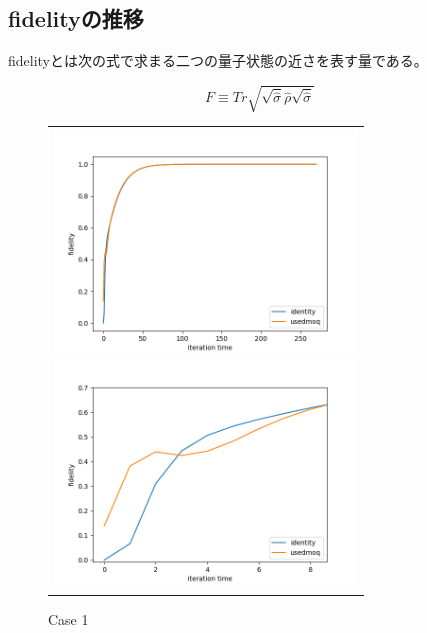 \documentclass[11pt,a4j,notitlepage]{jreport}
\begin{document}
	\newpage

	\subsection*{fidelityの推移}

	fidelityとは次の式で求まる二つの量子状態の近さを表す量である。

	\begin{equation}
		F \equiv Tr \sqrt{\sqrt{\hat{\sigma}} \hat{\rho} \sqrt{\hat{\sigma}}}
	\end{equation}

	\begin{figure}[htbp]
		\centering
			\begin{tabular}{c}
	  
				\begin{minipage}{0.5\hsize}
				\begin{center}
					\includegraphics[clip, width=8cm]{./picture/fp1111ed.png}
				\end{center}
				\end{minipage}
	  
				\begin{minipage}{0.5\hsize}
				\begin{center}
					\includegraphics[clip, width=8cm]{./picture/fp1111edextended.png}
				\end{center}
				\end{minipage}
			
			\end{tabular}
		\caption{Case 1}
	\end{figure}
\end{document}
